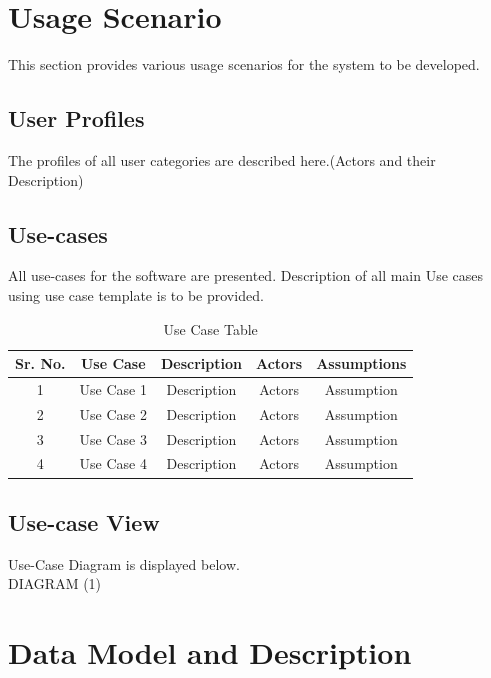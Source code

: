 \documentclass{report} %
\begin{document}
		\section{Usage Scenario}
		This section provides various usage scenarios for the system to be developed. \\
		
			\subsection{User Profiles}
			The profiles of all user categories are described here.(Actors and their Description) \\
			
			\subsection{Use-cases}
			All use-cases for the software are presented. Description of all main Use cases using use case template is to be provided. \\
			
			\begin{table}[H]
				\centering
				\renewcommand{\arraystretch}{1.5}
				\begin{tabular}{|c|c|c|c|c|}
					\hline
					\textbf{Sr. No.} & \textbf{Use Case} & \textbf{Description} & \textbf{Actors} & \textbf{Assumptions} \\
					\hline
					1 & Use Case 1 & Description & Actors & Assumption \\
					\hline
					2 & Use Case 2 & Description & Actors & Assumption \\
					\hline
					3 & Use Case 3 & Description & Actors & Assumption \\
					\hline
					4 & Use Case 4 & Description & Actors & Assumption \\
					\hline
				\end{tabular}
				\caption{Use Case Table}
			\end{table}
			
			\subsection{Use-case View}
			Use-Case Diagram is displayed below. \\
			
			DIAGRAM (1)
			
		\section{Data Model and Description}
			
\end{document}
